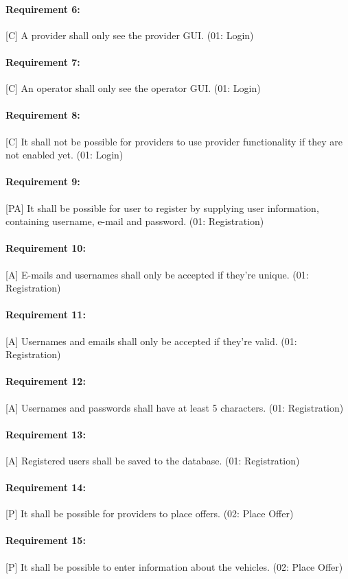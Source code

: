 \paragraph{Requirement 6:} [C] A provider shall only see the provider GUI. (01: Login)
\paragraph{Requirement 7:} [C] An operator shall only see the operator GUI. (01: Login)
\paragraph{Requirement 8:} [C] It shall not be possible for providers to use provider functionality if they are not enabled yet. (01: Login)

\paragraph{Requirement 9:} [PA] It shall be possible for user to register by supplying user information, containing username, e-mail and password. (01: Registration)
\paragraph{Requirement 10:} [A] E-mails and usernames shall only be accepted if they're unique. (01: Registration)
\paragraph{Requirement 11:} [A] Usernames and emails shall only be accepted if they're valid. (01: Registration)
\paragraph{Requirement 12:} [A] Usernames and passwords shall have at least 5 characters. (01: Registration)
\paragraph{Requirement 13:} [A] Registered users shall be saved to the database. (01: Registration)

\paragraph{Requirement 14:} [P] It shall be possible for providers to place offers. (02: Place Offer)
\paragraph{Requirement 15:} [P] It shall be possible to enter information about the vehicles. (02: Place Offer)
